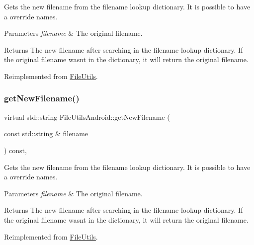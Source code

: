 Gets the new filename from the filename lookup dictionary. It is possible to have a override names. 
\begin{DoxyParams}{Parameters}
{\em filename} & The original filename. \\
\hline
\end{DoxyParams}
\begin{DoxyReturn}{Returns}
The new filename after searching in the filename lookup dictionary. If the original filename wasn\textquotesingle{}t in the dictionary, it will return the original filename. 
\end{DoxyReturn}


Reimplemented from \hyperlink{classFileUtils_a71e6d271830df5ba7484c69928c40f5a}{File\+Utils}.

\mbox{\label{classFileUtilsAndroid_ac084c26eecd3e89ab708ccdab36ec3de}} 
\subsubsection{\texorpdfstring{get\+New\+Filename()}{getNewFilename()}\hspace{0.1cm}{\footnotesize\ttfamily [2/2]}}
{\footnotesize\ttfamily virtual std\+::string File\+Utils\+Android\+::get\+New\+Filename (\begin{DoxyParamCaption}\item[{const std\+::string \&}]{filename }\end{DoxyParamCaption}) const\hspace{0.3cm}{\ttfamily [override]}, {\ttfamily [virtual]}}

Gets the new filename from the filename lookup dictionary. It is possible to have a override names. 
\begin{DoxyParams}{Parameters}
{\em filename} & The original filename. \\
\hline
\end{DoxyParams}
\begin{DoxyReturn}{Returns}
The new filename after searching in the filename lookup dictionary. If the original filename wasn\textquotesingle{}t in the dictionary, it will return the original filename. 
\end{DoxyReturn}


Reimplemented from \hyperlink{classFileUtils_a71e6d271830df5ba7484c69928c40f5a}{File\+Utils}.

